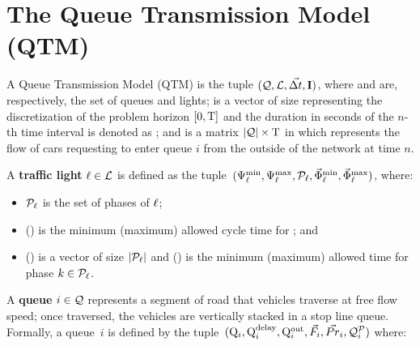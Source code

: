 \section{The Queue Transmission Model (QTM)}



A Queue Transmission Model (QTM) is the tuple $(\mathcal{Q}, \mathcal{L}, \vec{\Delta t}, \mathbf{I})$,
where \Qset and \Lset are, respectively, the set of queues and lights;
%
\vecDT is a vector of size \Nn representing the discretization of the problem
horizon $[0,\mathrm{T}]$ and the duration in seconds of the $n$-th time interval is
denoted as \DT[n];
%
%
and \MatQIN is a matrix $|\mathcal{Q}| \times \mathrm{T}$ in which  represents
the flow of cars requesting to enter queue $i$ from the outside of the network
at time $n$.



A \textbf{traffic light} $\ell \in \mathcal{L}$ is defined as the tuple~$(\mathrm{\Psi}_{\ell}^{\mathrm{min}},
\mathrm{\Psi}_{\ell}^{\mathrm{max}}, \mathcal{P}_\ell, \vec{\mathrm{\Phi}}_{\ell}^{\mathrm{min}}, \vec{\mathrm{\Phi}}_{\ell}^{\mathrm{max}})$, where:

\begin{itemize}
%
\item $\mathcal{P}_\ell$ is the set of phases of $\ell$;
%
\item \CTMIN{\tl} (\CTMAX{\tl}) is the minimum (maximum) allowed cycle time for
  \tl; and
%
\item \VecPTMIN{\tl} (\VecPTMAX{\tl}) is a vector of size $|\mathcal{P}_\ell|$ and
   () is the minimum (maximum) allowed time for
  phase $k \in \mathcal{P}_\ell$. 
%
\end{itemize}


A \textbf{queue} $i \in \mathcal{Q}$ represents a segment of road that vehicles
traverse at free flow speed; once traversed, the vehicles are vertically stacked
in a stop line queue.
%
Formally, a queue~$i$ is defined by the tuple~$(\mathrm{Q}_{i}, \mathrm{Q}_{i}^{\mathrm{delay}}, \mathrm{Q}_{i}^{\mathrm{out}},
\vec{F}_i, \vec{Pr}_i, \mathcal{Q}_{i}^{\mathcal{P}})$ where:

